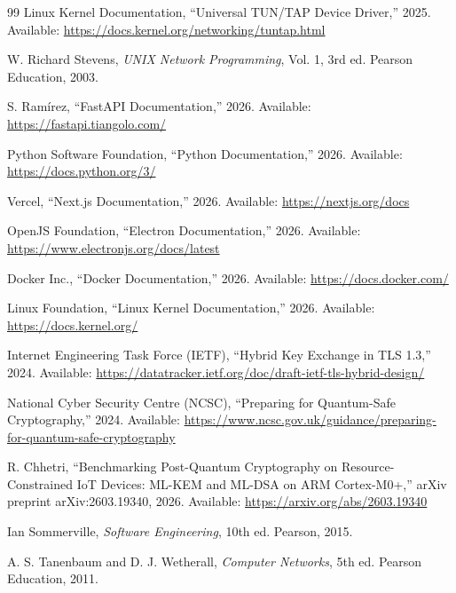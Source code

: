 \begin{thebibliography}{99}
Linux Kernel Documentation, 
``Universal TUN/TAP Device Driver,'' 
2025. Available: \url{https://docs.kernel.org/networking/tuntap.html}

W. Richard Stevens, 
\textit{UNIX Network Programming}, Vol. 1, 3rd ed. Pearson Education, 2003.


S. Ramírez, 
``FastAPI Documentation,'' 
2026. Available: \url{https://fastapi.tiangolo.com/}

Python Software Foundation, 
``Python Documentation,'' 
2026. Available: \url{https://docs.python.org/3/}

Vercel, 
``Next.js Documentation,'' 
2026. Available: \url{https://nextjs.org/docs}

OpenJS Foundation, 
``Electron Documentation,'' 
2026. Available: \url{https://www.electronjs.org/docs/latest}


Docker Inc., 
``Docker Documentation,'' 
2026. Available: \url{https://docs.docker.com/}

Linux Foundation, 
``Linux Kernel Documentation,'' 
2026. Available: \url{https://docs.kernel.org/}


Internet Engineering Task Force (IETF), 
``Hybrid Key Exchange in TLS 1.3,'' 
2024. Available: \url{https://datatracker.ietf.org/doc/draft-ietf-tls-hybrid-design/}

National Cyber Security Centre (NCSC), 
``Preparing for Quantum-Safe Cryptography,'' 
2024. Available: \url{https://www.ncsc.gov.uk/guidance/preparing-for-quantum-safe-cryptography}

R. Chhetri, 
``Benchmarking Post-Quantum Cryptography on Resource-Constrained IoT Devices: ML-KEM and ML-DSA on ARM Cortex-M0+,'' 
arXiv preprint arXiv:2603.19340, 2026. Available: \url{https://arxiv.org/abs/2603.19340}


Ian Sommerville, 
\textit{Software Engineering}, 10th ed. Pearson, 2015.

A. S. Tanenbaum and D. J. Wetherall, 
\textit{Computer Networks}, 5th ed. Pearson Education, 2011.

\end{thebibliography}